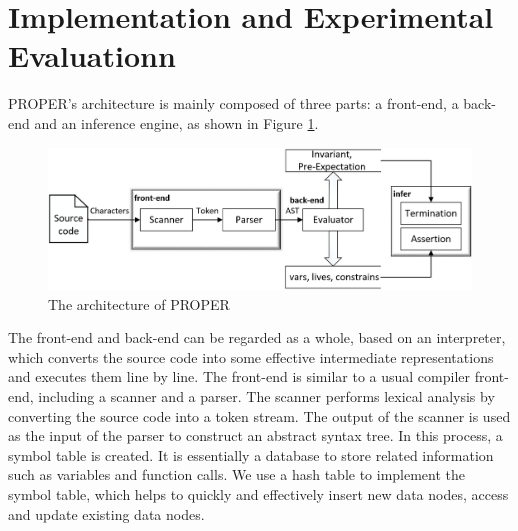 \documentclass[runningheads]{llncs}
\begin{document}
\section{Implementation and Experimental Evaluationn}
PROPER's architecture is mainly composed of three parts: a front-end, a back-end and an inference engine, as shown in Figure \ref{architecture}.  
\begin{figure}[htbp]
	\centering
	\includegraphics[scale=0.6]{img/architecture}
	\caption{The architecture of PROPER}
	\label{architecture}
\end{figure}

The front-end and back-end can be regarded as a whole, based on an interpreter, which converts the source code into some effective intermediate representations and executes them line by line. The front-end is similar to a usual compiler front-end, including a scanner and a parser. The scanner performs lexical analysis by converting the  source code  into a token stream.  The output of the scanner is used as the input of the parser to construct an abstract syntax tree.
In this process, a symbol table is created. It is essentially a database to store related information such as variables and function calls. %
We use a hash table to implement the symbol table, which helps to quickly and effectively insert new data nodes, access and update existing data nodes. %
\end{document}
